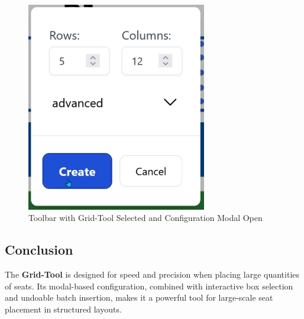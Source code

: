 \begin{figure}[H]
    \centering
    \includegraphics[width=0.7\textwidth]{pics/grid-tool.png}
    \caption{Toolbar with Grid-Tool Selected and Configuration Modal Open}
    \label{fig:grid-tool-toolbar}
\end{figure}

\subsection{Conclusion}
The \textbf{Grid-Tool} is designed for speed and precision when placing large quantities of seats. Its modal-based configuration, combined with interactive box selection and undoable batch insertion, makes it a powerful tool for large-scale seat placement in structured layouts.
